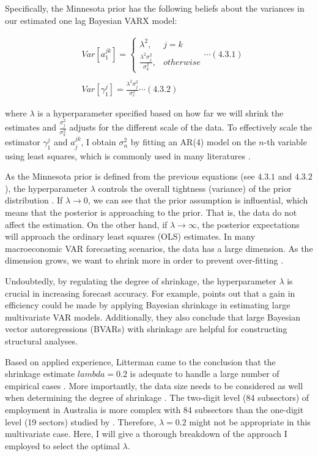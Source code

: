 \documentclass{monashthesis}
\begin{document}
Specifically, the Minnesota prior has the following beliefs about the variances in our estimated one lag Bayesian VARX model:

\[
\begin{aligned}
&Var[a_1^{jk}]= 
\begin{cases}
\lambda^2,&j=k\\
\frac{\lambda^2\sigma^2_{j}}{\sigma^2_k},& otherwise
\end{cases}\cdots(4.3.1)\\
\\
&Var[\gamma_1^{j}]=\frac{\lambda^2\sigma^2_{j}}{\sigma^2_e}\cdots(4.3.2)
\end{aligned}
\]

where \(\lambda\) is a hyperparameter specified based on how far we will shrink the estimates and \(\frac{\sigma^2_{j}}{\sigma^2_k}\) adjusts for the different scale of the data. To effectively scale the estimator \(\gamma^j_1\) and \(a_j^{jk}\), I obtain \(\sigma_n^2\) by fitting an AR(4) model on the \(n\)-th variable using least squares, which is commonly used in many literatures \autocite{anderson2020,banbura2010large,koop2013}.

As the Minnesota prior is defined from the previous equations (see \(4.3.1\) and \(4.3.2\)), the hyperparameter \(\lambda\) controls the overall tightness (variance) of the prior distribution \autocite{banbura2010large}. If \(\lambda\rightarrow0\), we can see that the prior assumption is influential, which means that the posterior is approaching to the prior. That is, the data do not affect the estimation. On the other hand, if \(\lambda\rightarrow\infty\), the posterior expectations will approach the ordinary least squares (OLS) estimates. In many macroeconomic VAR forecasting scenarios, the data has a large dimension. As the dimension grows, we want to shrink more in order to prevent over-fitting \autocite{de2008}.

Undoubtedly, by regulating the degree of shrinkage, the hyperparameter \(\lambda\) is crucial in increasing forecast accuracy. For example, \textcite{banbura2010large} points out that a gain in efficiency could be made by applying Bayesian shrinkage in estimating large multivariate VAR models. Additionally, they also conclude that large Bayesian vector autoregressions (BVARs) with shrinkage are helpful for constructing structural analyses.

Based on applied experience, Litterman came to the conclusion that the shrinkage estimate \(lambda=0.2\) is adequate to handle a large number of empirical cases \autocite{litterman1986}. More importantly, the data size needs to be considered as well when determining the degree of shrinkage \autocite{banbura2010large}. The two-digit level (84 subsectors) of employment in Australia is more complex with 84 subsectors than the one-digit level (19 sectors) studied by \textcite{anderson2020}. Therefore, \(\lambda=0.2\) might not be appropriate in this multivariate case. Here, I will give a thorough breakdown of the approach I employed to select the optimal \(\lambda\).
\end{document}

